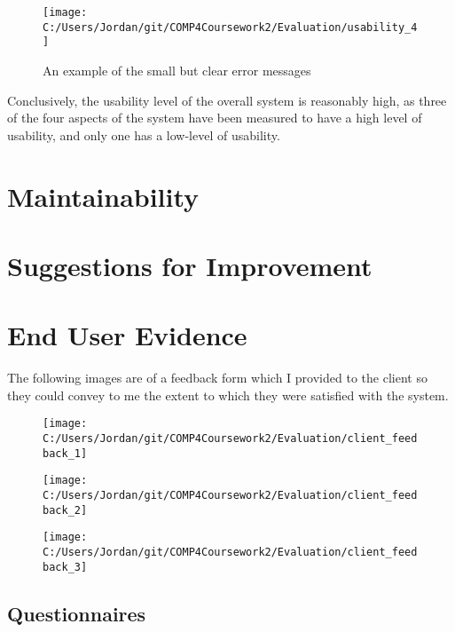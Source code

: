 \begin{figure}[H]
	\texttt{[image: C:/Users/Jordan/git/COMP4Coursework2/Evaluation/usability\_4]}
	\caption{An example of the small but clear error messages}
\end{figure}

Conclusively, the usability level of the overall system is reasonably high, as three of the four aspects of the system have been measured to have a high level of usability, and only one has a low-level of usability.

\section{Maintainability}

\section{Suggestions for Improvement}



















\section{End User Evidence}

The following images are of a feedback form which I provided to the client so they could convey to me the extent to which they were satisfied with the system.

\begin{figure}[H]
	\texttt{[image: C:/Users/Jordan/git/COMP4Coursework2/Evaluation/client\_feedback\_1]}
\end{figure}

\begin{figure}[H]
	\texttt{[image: C:/Users/Jordan/git/COMP4Coursework2/Evaluation/client\_feedback\_2]}
\end{figure}

\begin{figure}[H]
	\texttt{[image: C:/Users/Jordan/git/COMP4Coursework2/Evaluation/client\_feedback\_3]}
\end{figure}

\subsection{Questionnaires}

